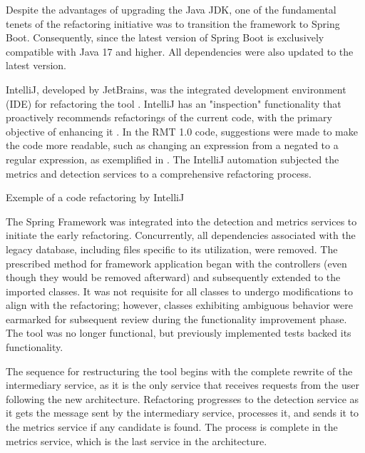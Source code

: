 Despite the advantages of upgrading the Java JDK, one of the fundamental tenets of the refactoring initiative was to transition the framework to Spring Boot. Consequently, since the latest version of Spring Boot is exclusively compatible with Java 17 and higher. All dependencies were also updated to the latest version.

IntelliJ, developed by JetBrains, was the integrated development environment (IDE) for refactoring the tool \cite{intellij}. IntelliJ has an "inspection" functionality that proactively recommends refactorings of the current code, with the primary objective of enhancing it \cite{intellij-inspection}. In the RMT 1.0 code, suggestions were made to make the code more readable, such as changing an expression from a negated to a regular expression, as exemplified in . The IntelliJ automation subjected the metrics and detection services to a comprehensive refactoring process.

\begin{algorithm}[!htbp]
\caption{Exemple of a code refactoring by IntelliJ}%
\label{alg-intellij}
\begin{algorithmic}[1]
 
 
\end{algorithmic}
\end{algorithm}
\FloatBarrier

The Spring Framework was integrated into the detection and metrics services to initiate the early refactoring. Concurrently, all dependencies associated with the legacy database, including files specific to its utilization, were removed. The prescribed method for framework application began with the controllers (even though they would be removed afterward) and subsequently extended to the imported classes. It was not requisite for all classes to undergo modifications to align with the refactoring; however, classes exhibiting ambiguous behavior were earmarked for subsequent review during the functionality improvement phase. The tool was no longer functional, but previously implemented tests backed its functionality.

The sequence for restructuring the tool begins with the complete rewrite of the intermediary service, as it is the only service that receives requests from the user following the new architecture. Refactoring progresses to the detection service as it gets the message sent by the intermediary service, processes it, and sends it to the metrics service if any candidate is found. The process is complete in the metrics service, which is the last service in the architecture.


